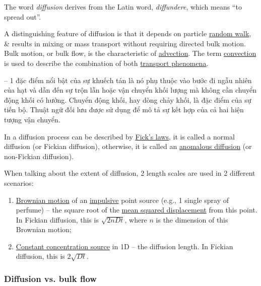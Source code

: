 \documentclass{article}
\begin{document}
The word {\it diffusion} derives from the Latin word, {\it diffundere}, which means ``to spread out''.

A distinguishing feature of diffusion is that it depends on particle \href{https://en.wikipedia.org/wiki/Random_walk}{random walk}, \& results in mixing or mass transport without requiring directed bulk motion. Bulk motion, or bulk flow, is the characteristic of \href{https://en.wikipedia.org/wiki/Advection}{advection}. The term \href{https://en.wikipedia.org/wiki/Convection}{convection} is used to describe the combination of both \href{https://en.wikipedia.org/wiki/Transport_phenomena}{transport phenomena}.

-- 1 đặc điểm nổi bật của sự khuếch tán là nó phụ thuộc vào bước đi ngẫu nhiên của hạt và dẫn đến sự trộn lẫn hoặc vận chuyển khối lượng mà không cần chuyển động khối có hướng. Chuyển động khối, hay dòng chảy khối, là đặc điểm của sự tiến bộ. Thuật ngữ đối lưu được sử dụng để mô tả sự kết hợp của cả hai hiện tượng vận chuyển.

In a diffusion process can be described by \href{https://en.wikipedia.org/wiki/Fick%27s_laws_of_diffusion}{Fick's laws}, it is called a normal diffusion (or Fickian diffusion), otherwise, it is called an \href{https://en.wikipedia.org/wiki/Anomalous_diffusion}{anomalous diffusion} (or non-Fickian diffusion).

When talking about the extent of diffusion, 2 length scales are used in 2 different scenarios:
\begin{enumerate}
	\item \href{https://en.wikipedia.org/wiki/Brownian_motion}{Brownian motion} of an \href{https://en.wikipedia.org/wiki/Impulse_response}{impulsive} point source (e.g., 1 single spray of perfume) -- the square root of the \href{https://en.wikipedia.org/wiki/Mean_squared_displacement}{mean squared displacement} from this point. In Fickian diffusion, this is $\sqrt{2nDt}$, where $n$ is the dimension of this Brownian motion;
	\item \href{https://en.wikipedia.org/wiki/Fick%27s_laws_of_diffusion#Example_solutions_and_generalization}{Constant concentration source} in 1D -- the diffusion length. In Fickian diffusion, this is $2\sqrt{Dt}$.
\end{enumerate}

\subsubsection{Diffusion vs. bulk flow}
\end{document}
